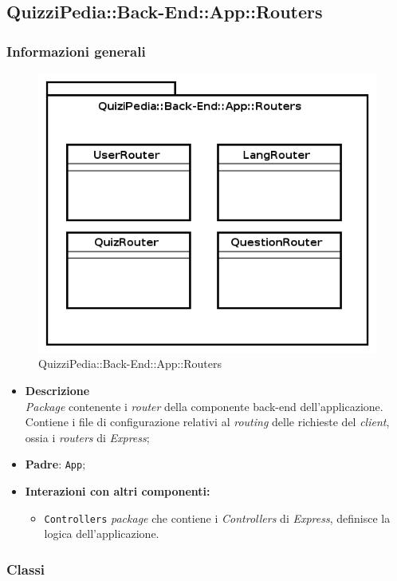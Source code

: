 \subsection{QuizziPedia::Back-End::App::Routers}
\subsubsection{Informazioni generali}
\label{QuizziPedia::Back-End::App::Routers}
\begin{figure}[ht]
	\centering
	\includegraphics[scale=0.7]{UML/Package/QuizziPedia_Back-End_App_Routers.png}
	\caption{QuizziPedia::Back-End::App::Routers}
\end{figure}
\FloatBarrier
	\begin{itemize}
		\item \textbf{Descrizione} \\
		\textit{Package} contenente i \textit{router} della componente back-end dell'applicazione. Contiene i file di configurazione relativi al \textit{routing} delle richieste del \textit{client}, ossia i \textit{routers} di \textit{Express};
		\item \textbf{Padre}: \texttt{App};
		\item \textbf{Interazioni con altri componenti:}
			\begin{itemize}
				\item \texttt{Controllers} \textit{package} che contiene i \textit{Controllers} di \textit{Express}, definisce la logica dell'applicazione.
			\end{itemize}
	\end{itemize}
\subsubsection{Classi}





